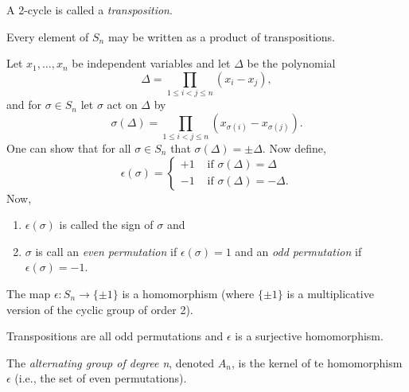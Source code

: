 \documentclass[../main]{subfiles}
\begin{document}
  
  \begin{dfn}
   A 2-cycle is called a \textit{transposition}.
  \end{dfn}
  
  
  \begin{nt}
   Every element of $S_n$ may be written as a product of transpositions.
  \end{nt}
  
  
  \begin{dfn}
   Let $x_1,\ldots,x_n$ be independent variables and let $\Delta$ be the polynomial 
   \[\Delta = \prod_{1\leq i < j \leq n} (x_i - x_j),\] 
   and for $\sigma \in S_n$ let $\sigma$ act on $\Delta$ by
   \[\sigma(\Delta)= \prod_{1\leq i < j \leq n} (x_{\sigma(i)} - x_{\sigma(j)}).\]
   One can show that for all $\sigma \in S_n$ that $\sigma(\Delta) = \pm \Delta$. Now define,
   \begin{equation*}
    \epsilon(\sigma)= 
   \begin{cases}
    +1 & \text{ if } \sigma(\Delta) = \Delta \\
    -1 & \text{ if } \sigma(\Delta) = -\Delta.
   \end{cases}
   \end{equation*}
   Now, 
   \begin{enumerate}
    \item $\epsilon(\sigma)$ is called the sign of $\sigma$ and 
    \item $\sigma$ is call an \textit{even permutation} if $\epsilon(\sigma) = 1$ and an \textit{odd permutation} if $\epsilon(\sigma) = -1$.
   \end{enumerate}
  \end{dfn}
  
  
  \begin{prop}
   The map $\epsilon \colon S_n \to \{\pm 1\}$ is a homomorphism (where $\{\pm 1 \}$ is a multiplicative version of the cyclic group of order 2).
  \end{prop}
  
  
  \begin{prop}
   Transpositions are all odd permutations and $\epsilon$ is a surjective homomorphism.
  \end{prop}
  
  
  \begin{dfn}
   The \textit{alternating group of degree n}, denoted $A_n$, is the kernel of te homomorphism $\epsilon$ (i.e., the set of even permutations).
  \end{dfn}
  
\end{document}
